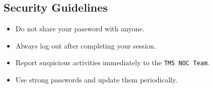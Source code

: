 \vspace{0.5em}
\subsection{Security Guidelines}
\begin{itemize}[label=--]
  \item Do not share your password with anyone.
  \item Always log out after completing your session.
  \item Report suspicious activities immediately to the \texttt{TMS NOC Team}.
  \item Use strong passwords and update them periodically.
\end{itemize}
